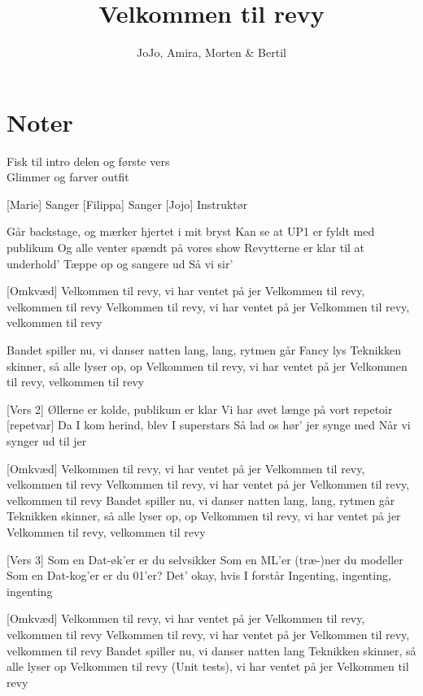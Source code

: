 \documentclass{article}
\title{Velkommen til revy}                   %
\author{JoJo, Amira, Morten \& Bertil}  %
\begin{document}
                
\maketitle
\section*{Noter}                %
Fisk til intro delen og første vers\\
Glimmer og farver outfit

\begin{roles}
[Marie] Sanger
[Filippa] Sanger
[Jojo] Instruktør
\end{roles}

\begin{props}
\end{props}


\newpage%
\begin{song}
[Vers 1]
Går backstage, og mærker hjertet i mit bryst
Kan se at UP1 er fyldt med publikum
Og alle venter spændt på vores show
Revytterne er klar til at underhold’
\scene Tæppe op og sangere ud
Så vi sir’


[Omkvæd]
Velkommen til revy, vi har ventet på jer
Velkommen til revy, velkommen til revy
Velkommen til revy, vi har ventet på jer
Velkommen til revy, velkommen til revy

Bandet spiller nu, vi danser natten lang,
lang, rytmen går 
\scene Fancy lys
Teknikken skinner, så alle lyser op,
op
Velkommen til revy, vi har ventet på jer
Velkommen til revy, velkommen til revy



[Vers 2]
Øllerne er kolde, publikum er klar
Vi har øvet længe på vort repetoir [repetvar]
Da I kom herind, blev I superstars
Så lad os hør’ jer synge med
Når vi synger ud til jer



[Omkvæd]
Velkommen til revy, vi har ventet på jer
Velkommen til revy, velkommen til revy
Velkommen til revy, vi har ventet på jer
Velkommen til revy, velkommen til revy
Bandet spiller nu, vi danser natten lang,
lang, rytmen går 
Teknikken skinner, så alle lyser op,
op
Velkommen til revy, vi har ventet på jer
Velkommen til revy, velkommen til revy




[Vers 3]
Som en Dat-øk’er er du selvsikker
Som en ML’er (træ-)ner du modeller
Som en Dat-kog’er er du 01’er?
Det’ okay, hvis I forstår
Ingenting, ingenting, ingenting





[Omkvæd]
Velkommen til revy, vi har ventet på jer
Velkommen til revy, velkommen til revy
Velkommen til revy, vi har ventet på jer
Velkommen til revy, velkommen til revy
Bandet spiller nu, vi danser natten lang
Teknikken skinner, så alle lyser op
Velkommen til revy (Unit tests), vi har ventet på jer
Velkommen til revy 


\end{song}
\end{document}
